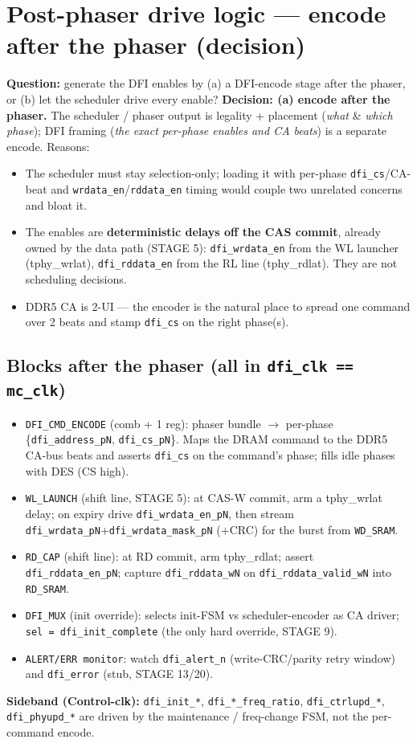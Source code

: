 \documentclass[9pt]{extarticle}
\begin{document}
\section{Post-phaser drive logic --- \textbf{encode after the phaser} (decision)}
\textbf{Question:} generate the DFI enables by (a) a DFI-encode stage after the phaser, or (b) let
the scheduler drive every enable? \textbf{Decision: (a) encode after the phaser.} The scheduler /
phaser output is legality + placement (\emph{what} \& \emph{which phase}); DFI framing (\emph{the
exact per-phase enables and CA beats}) is a separate encode. Reasons:
\begin{itemize}\itemsep1pt
\item The scheduler must stay selection-only; loading it with per-phase \texttt{dfi\_cs}/CA-beat and
  \texttt{wrdata\_en}/\texttt{rddata\_en} timing would couple two unrelated concerns and bloat it.
\item The enables are \textbf{deterministic delays off the CAS commit}, already owned by the data
  path (STAGE 5): \texttt{dfi\_wrdata\_en} from the WL launcher (tphy\_wrlat), \texttt{dfi\_rddata\_en}
  from the RL line (tphy\_rdlat). They are not scheduling decisions.
\item DDR5 CA is 2-UI --- the encoder is the natural place to spread one command over 2 beats and
  stamp \texttt{dfi\_cs} on the right phase(s).
\end{itemize}

\subsection{Blocks after the phaser (all in \texttt{dfi\_clk == mc\_clk})}
\begin{itemize}\itemsep1pt
\item \texttt{DFI\_CMD\_ENCODE} (comb + 1 reg): phaser bundle $\rightarrow$ per-phase
  \{\texttt{dfi\_address\_pN}, \texttt{dfi\_cs\_pN}\}. Maps the DRAM command to the DDR5 CA-bus beats
  and asserts \texttt{dfi\_cs} on the command's phase; fills idle phases with DES (CS high).
\item \texttt{WL\_LAUNCH} (shift line, STAGE 5): at CAS-W commit, arm a tphy\_wrlat delay; on expiry
  drive \texttt{dfi\_wrdata\_en\_pN}, then stream \texttt{dfi\_wrdata\_pN}+\texttt{dfi\_wrdata\_mask\_pN}
  (+CRC) for the burst from \texttt{WD\_SRAM}.
\item \texttt{RD\_CAP} (shift line): at RD commit, arm tphy\_rdlat; assert \texttt{dfi\_rddata\_en\_pN};
  capture \texttt{dfi\_rddata\_wN} on \texttt{dfi\_rddata\_valid\_wN} into \texttt{RD\_SRAM}.
\item \texttt{DFI\_MUX} (init override): selects init-FSM vs scheduler-encoder as CA driver;
  \texttt{sel = dfi\_init\_complete} (the only hard override, STAGE 9).
\item \texttt{ALERT/ERR monitor}: watch \texttt{dfi\_alert\_n} (write-CRC/parity retry window) and
  \texttt{dfi\_error} (stub, STAGE 13/20).
\end{itemize}
\textbf{Sideband (Control-clk):} \texttt{dfi\_init\_*}, \texttt{dfi\_*\_freq\_ratio},
\texttt{dfi\_ctrlupd\_*}, \texttt{dfi\_phyupd\_*} are driven by the maintenance / freq-change FSM,
not the per-command encode.
\end{document}
